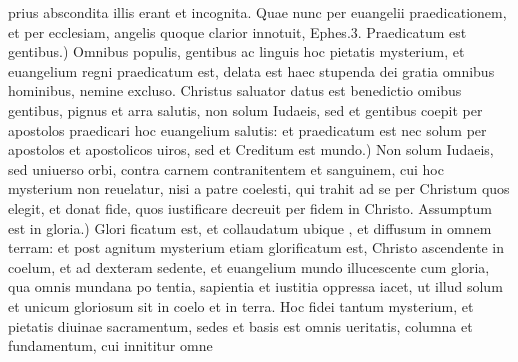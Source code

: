 \documentclass{article}
\begin{document}
\begin{pages}
prius abscondita illis erant et incognita. Quae nunc per euangelii praedicationem, et per ecclesiam, angelis quoque clarior innotuit, Ephes.3. Praedicatum est gentibus.) Omnibus populis, gentibus ac linguis hoc pietatis mysterium, et euangelium regni praedicatum est, delata est haec stupenda dei gratia omnibus hominibus, nemine excluso. Christus saluator datus est benedictio omibus gentibus, pignus et arra salutis, non solum Iudaeis, sed et gentibus coepit per apostolos praedicari hoc euangelium salutis: et praedicatum est nec solum per apostolos et apostolicos uiros, sed et Creditum est mundo.) Non solum Iudaeis, sed uniuerso orbi, contra carnem contranitentem et sanguinem, cui hoc mysterium non reuelatur, nisi a patre coelesti, qui trahit ad se per Christum quos elegit, et donat fide, quos iustificare decreuit per fidem in Christo. Assumptum est in gloria.) Glori ficatum est, et collaudatum ubique , et diffusum in omnem terram: et post agnitum mysterium etiam glorificatum est, Christo ascendente in coelum, et ad dexteram sedente, et euangelium mundo illucescente cum gloria, qua omnis mundana po tentia, sapientia et iustitia oppressa iacet, ut illud solum et unicum gloriosum sit in coelo et in terra. Hoc fidei tantum mysterium, et pietatis diuinae sacramentum, sedes et basis est omnis ueritatis, columna et fundamentum, cui innititur omne  \pend

\end{pages}
\end{document}
